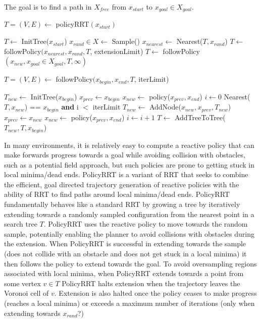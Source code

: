\documentclass[../thesis.tex]{subfiles}
\begin{document}
The goal is to find a path in $X_{free}$ from $x_{start}$ to $x_{goal} \in X_{goal}$.


\begin{algorithm}
\caption{$T=(V,E) \leftarrow$ policyRRT$(x_{start})$}\label{euclid}
\begin{algorithmic}[1]
\State $T \leftarrow$ InitTree($x_{start}$)
\State $x_{rand} \in X \leftarrow$ Sample()
\State $x_{nearest} \leftarrow $ Nearest($T, x_{rand}$)
\State $T \leftarrow $ followPolicy$(x_{nearest}, x_{rand}, T$, extensionLimit)
\State $T \leftarrow $ followPolicy$(x_{new}, x_{goal} \in X_{goal}, T, \infty)$
\EndIf
\EndWhile
\end{algorithmic}
\end{algorithm}

\begin{algorithm}
\caption{$T=(V,E) \leftarrow$ followPolicy$(x_{begin}, x_{end}, T$, iterLimit)}\label{euclid}
\begin{algorithmic}[1]
\State $T_{new} \leftarrow $ InitTree($x_{begin}$)
\State $x_{prev} \leftarrow x_{begin}$
\State $x_{new} \leftarrow $ policy($x_{prev}, x_{end}$)
\State $i \leftarrow 0$
\StatexIndent[2] Nearest($T, x_{new}$) == $x_{begin}$ \textbf{and}
\StatexIndent[2] i $<$ iterLimit
\algorithmicdo
\State $T_{new} \leftarrow $ AddNode($x_{new}, x_{prev}, T_{new}$)
\State $x_{prev} \leftarrow x_{new}$ 
\State $x_{new} \leftarrow $ policy($x_{prev}, x_{end}$)
\State $i \leftarrow i+1$
\EndWhile
\State $T \leftarrow $ AddTreeToTree($T_{new}, T, x_{begin}$)
\end{algorithmic}
\end{algorithm}

In many environments, it is relatively easy to compute a reactive policy that can make forwards progress towards a goal while avoiding collision with obstacles, such as a potential field approach, but such policies are prone to getting stuck in local minima/dead ends.  PolicyRRT is a variant of RRT that seeks to combine the efficient, goal directed trajectory generation of reactive policies with the ability of RRT to find paths around local minima/dead ends.  PolicyRRT fundamentally behaves like a standard RRT by growing a tree by iteratively extending towards a randomly sampled configuration from the nearest point in a search tree $T$.  PolicyRRT uses the reactive policy to move towards the random sample, potentially enabling the planner to avoid collisions with obstacles during the extension.  When PolicyRRT is successful in extending towards the sample (does not collide with an obstacle and does not get stuck in a local minima) it then follows the policy to extend towards the goal.  To avoid oversampling regions associated with local minima, when PolicyRRT extends towards a point from some vertex $v \in T$ PolicyRRT halts extension when the trajectory leaves the Voronoi cell of $v$.  Extension is also halted once the policy ceases to make progress (reaches a local minima) or exceeds a maximum number of iterations (only when extending towards $x_{rand}$?)
\end{document}
